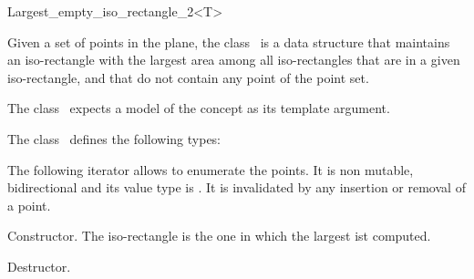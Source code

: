 

\begin{ccRefClass}{Largest_empty_iso_rectangle_2<T>}


\ccDefinition
  
Given a set of points in the plane, the class \ccRefName\ is a data
structure that maintains an iso-rectangle with the largest area among
all iso-rectangles that are in a given iso-rectangle, and
that do not contain any point of the point set.

The class \ccRefName\ expects a model of the concept  as its template argument.  



\ccTypes
The class \ccClassTemplateName\ defines the following types:

\ccThreeToTwo


\ccGlue
{}


The following iterator allows to enumerate the points. 
It is non mutable, bidirectional
and its value type is . 
It is invalidated by any insertion or removal of a point. 



\ccCreation
{}  %

{Constructor. The iso-rectangle  is the one in which the largest ist computed.} 

{Destructor.}


\end{ccRefClass}
